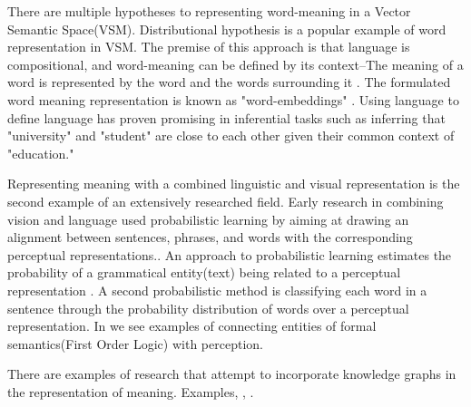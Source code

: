 \documentclass[11pt, a4paper]{article}
\begin{document}
There are multiple hypotheses to representing word-meaning in a Vector Semantic Space(VSM). Distributional hypothesis is a popular example of word representation in VSM. The premise of this approach is that language is compositional, and word-meaning can be defined by its context--The meaning of a word is represented by the word and the words surrounding it \cite{Turney_2010}. The formulated word meaning representation is known as "word-embeddings" \cite{mikolov2013distributed}. Using language to define language has proven promising in inferential tasks such as inferring that "university" and "student" are close to each other given their common context of "education." 

 
Representing meaning with a combined linguistic and visual representation is the second example of an extensively researched field. Early research in combining vision and language used probabilistic learning by aiming at drawing an alignment between sentences, phrases, and words with the corresponding perceptual representations.\cite{790410}. An approach to probabilistic learning estimates the probability of a grammatical entity(text) being related to a perceptual representation \cite{6751319}. A second probabilistic method is classifying each word in a sentence through the probability distribution of words over a perceptual representation. In \cite{matuszek2012joint} \cite{larsson2015formal} we see examples of connecting entities of formal semantics(First Order Logic) with perception. 

There are examples of research that attempt to incorporate knowledge graphs in the representation of meaning. Examples, \cite{zhu2015building}, \cite{zhu2014reasoning}. 
\end{document}
